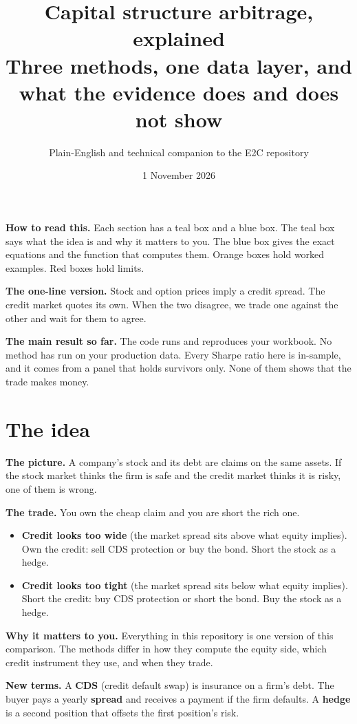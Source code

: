 \documentclass[11pt]{article}
\title{Capital structure arbitrage, explained\\[0.3em]
\large Three methods, one data layer, and what the evidence does and does not show}
\author{Plain-English and technical companion to the E2C repository}
\date{1 November 2026}
\newcommand{\term}[1]{\textbf{#1}}
\begin{document}
\maketitle

\begin{plainbox}
\term{How to read this.} Each section has a teal box and a blue box. The teal box says what the idea is and why it matters to you. The blue box gives the exact equations and the function that computes them. Orange boxes hold worked examples. Red boxes hold limits.

\term{The one-line version.} Stock and option prices imply a credit spread. The credit market quotes its own. When the two disagree, we trade one against the other and wait for them to agree.

\term{The main result so far.} The code runs and reproduces your workbook. No method has run on your production data. Every Sharpe ratio here is in-sample, and it comes from a panel that holds survivors only. None of them shows that the trade makes money.
\end{plainbox}

\tableofcontents

\section{The idea}

\begin{plainbox}
\term{The picture.} A company's stock and its debt are claims on the same assets. If the stock market thinks the firm is safe and the credit market thinks it is risky, one of them is wrong.

\term{The trade.} You own the cheap claim and you are short the rich one.
\begin{itemize}[leftmargin=1.2em,nosep]
\item \term{Credit looks too wide} (the market spread sits above what equity implies). Own the credit: sell CDS protection or buy the bond. Short the stock as a hedge.
\item \term{Credit looks too tight} (the market spread sits below what equity implies). Short the credit: buy CDS protection or short the bond. Buy the stock as a hedge.
\end{itemize}

\term{Why it matters to you.} Everything in this repository is one version of this comparison. The methods differ in how they compute the equity side, which credit instrument they use, and when they trade.

\term{New terms.} A \term{CDS} (credit default swap) is insurance on a firm's debt. The buyer pays a yearly \term{spread} and receives a payment if the firm defaults. A \term{hedge} is a second position that offsets the first position's risk.
\end{plainbox}
\end{document}
